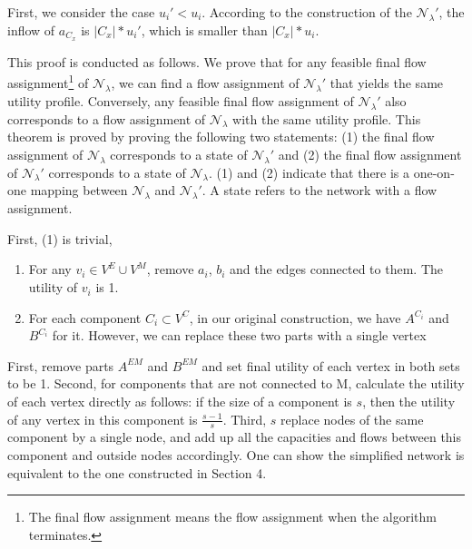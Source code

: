 \documentclass[10pt,a4paper]{article}
\begin{document}
First, we consider the case $u_i'<u_i$. According to the construction of the $\mathcal{N_\lambda'}$, the inflow of $a_{C_x}$ is $|C_x|*u_i'$, which is smaller than $|C_x|*u_i$. 


This proof is conducted as follows. We prove that for any feasible final flow assignment\footnote{The final flow assignment means the flow assignment when the algorithm terminates.} of $\mathcal{N_\lambda}$, we can find a flow assignment of $\mathcal{N_\lambda}'$ that yields the same utility profile. Conversely, any feasible final flow assignment of $\mathcal{N_\lambda}'$ also corresponds to a flow assignment of $\mathcal{N_\lambda}$ with the same utility profile.
This theorem is proved by proving the following two statements: (1) the final flow assignment of $\mathcal{N_\lambda}$ corresponds to a state of $\mathcal{N_\lambda}'$ and (2) the final flow assignment of $\mathcal{N_\lambda}'$ corresponds to a state of $\mathcal{N_\lambda}$. (1) and (2) indicate that there is a one-on-one mapping between $\mathcal{N_\lambda}$ and $\mathcal{N_\lambda}'$. A state refers to the network with a flow assignment.

First, (1) is trivial,  

\begin{enumerate}
	\item For any $v_i\in V^E\cup V^M$, remove $a_i$, $b_i$ and the edges connected to them. The utility of $v_i$ is 1.
	\item For each component $C_i\subset V^C$, in our original construction, we have $A^{C_i}$ and $B^{C_i}$ for it. However, we can replace these two parts with a single vertex
\end{enumerate}
First, remove parts $A^{EM}$ and $B^{EM}$ and set final utility of each vertex
in both sets to be 1. Second, for components that are not connected to
M, calculate the utility of each vertex directly as follows: if the size of a
component is $s$, then the utility of any vertex in this component is $\frac{s-1}{s}$. Third, $s$
replace nodes of the same component by a single node, and add up all the capacities and flows between this component and outside nodes accordingly. One can show the simplified network is equivalent to the one constructed in Section 4.
\end{document}
